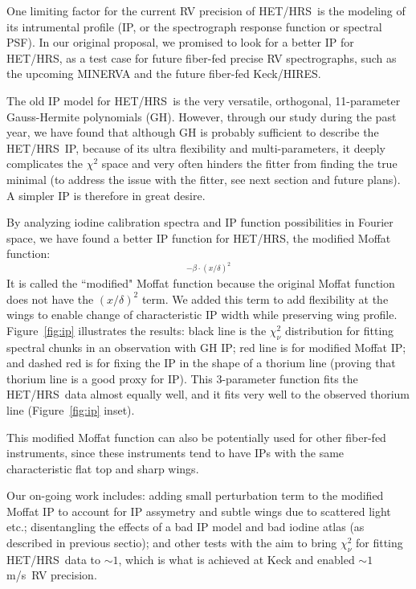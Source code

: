 \documentclass[12pt]{article}
\def\mps{m/s}
\def\hrs{HET/HRS}
\begin{document}
One limiting factor for the current RV precision of \hrs\ is the
modeling of its intrumental profile (IP, or the spectrograph response
function or spectral PSF). In our original proposal, we promised to
look for a better IP for \hrs, as a test case for future fiber-fed
precise RV spectrographs, such as the upcoming MINERVA and the future
fiber-fed Keck/HIRES.

The old IP model for \hrs\ is the very versatile, orthogonal,
11-parameter Gauss-Hermite polynomials (GH). However, through our
study during the past year, we have found that although GH is probably
sufficient to describe the \hrs\ IP, because of its ultra flexibility
and multi-parameters, it deeply complicates the $\chi^2$ space and
very often hinders the fitter from finding the true minimal (to
address the issue with the fitter, see next section and future
plans). A simpler IP is therefore in great desire.

By analyzing iodine calibration spectra and IP function possibilities
in Fourier space, we have found a better IP function for \hrs, the
modified Moffat function:
\begin{equation}
[1+(x/\theta)^2]^{-\beta\cdot(x/\delta)^2}
\end{equation} 
It is called the ``modified" Moffat function because the original
Moffat function does not have the $(x/\delta)^2$ term. We added this
term to add flexibility at the wings to enable change of characteristic
IP width while preserving wing profile. Figure~\ref{fig:ip}
illustrates the results: black line is the $\chi^2_\nu$ distribution
for fitting spectral chunks in an observation with GH IP; red line is
for modified Moffat IP; and dashed red is for fixing the IP in the
shape of a thorium line (proving that thorium line is a good proxy for
IP). This 3-parameter function fits the \hrs\ data almost equally
well, and it fits very well to the observed thorium line
(Figure~\ref{fig:ip} inset).

This modified Moffat function can also be potentially used for other
fiber-fed instruments, since these instruments tend to have IPs with
the same characteristic flat top and sharp wings.

Our on-going work includes: adding small perturbation term to the
modified Moffat IP to account for IP assymetry and subtle wings due to
scattered light etc.; disentangling the effects of a bad IP model and
bad iodine atlas (as described in previous sectio); and other tests
with the aim to bring $\chi^2_\nu$ for fitting \hrs\ data to $\sim 1$,
which is what is achieved at Keck and enabled $\sim 1$ \mps\ RV
precision.
\end{document}
